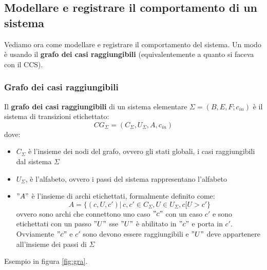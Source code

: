 \subsection{Modellare e registrare il comportamento di un sistema}
Vediamo ora come modellare e registrare il comportamento del sistema. Un modo è
usando il \textbf{grafo dei casi raggiungibili} (equivalentemente a quanto si
faceva con il CCS).
\newpage
\subsubsection{Grafo dei casi raggiungibili}
\begin{definizione}
  Il \textbf{grafo dei casi raggiungibili} di un sistema elementare
  $\Sigma=(B, E, F;c_{in})$ è il sistema di transizioni etichettato:
  \[CG_\Sigma=(C_\Sigma, U_\Sigma, A, c_{in})\]
  dove:
  \begin{itemize}
    \item $C_\Sigma$ è l'insieme dei nodi del grafo, ovvero gli stati globali,
    i casi raggiungibili dal sistema $\Sigma$    
    \item $U_\Sigma$, è l'alfabeto, ovvero i passi del sistema rappresentano
    l'alfabeto 
    \item $"A"$ è l'insieme di archi etichettati, formalmente definito come:
    \[A=\{(c, U, c')|\, c, c'\in C_\Sigma, U\in U_\Sigma, c[U>c'\}\]
    ovvero sono archi che connettono uno caso $"c"$ con un caso $c'$ e sono
    etichettati con un passo $"U"$ sse $"U"$ è abilitato in $"c"$ e porta in
    $c'$. Ovviamente $"c"$ e $c'$ sono devono essere raggiungibili e $"U"$ deve
    appartenere all'insieme dei passi di $\Sigma$
  \end{itemize}
  Esempio in figura \ref{fig:gra}.
\end{definizione} \vspace{5mm} %

